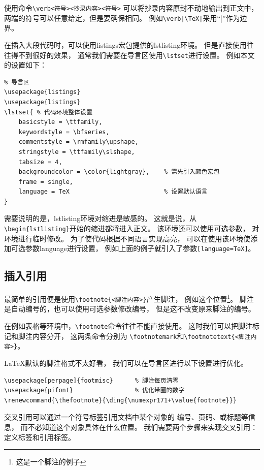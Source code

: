 \documentclass[UTF8]{ctexart}
\numberwithin{equation}{section}			%
\renewcommand{\thefootnote}{\ding{\numexpr171+\value{footnote}}}
\begin{document}
    使用命令\verb|\verb<符号><抄录内容><符号>|
    可以将抄录内容原封不动地输出到正文中，
    两端的符号可以任意给定，但是要确保相同。
    例如\verb~\verb|\TeX|~采用“|”作为边界。
    
    在插入大段代码时，可以使用listings宏包提供的lstlisting环境。
    但是直接使用往往得不到很好的效果，
    通常我们需要在导言区使用\verb|\lstset|进行设置。
    例如本文的设置如下：

\begin{lstlisting}
% 导言区
\usepackage{listings}
\usepackage{listings}
\lstset{ % 代码环境整体设置
    basicstyle = \ttfamily,
    keywordstyle = \bfseries,
    commentstyle = \rmfamily\upshape,
    stringstyle = \ttfamily\slshape,
    tabsize = 4,
    backgroundcolor = \color{lightgray},	% 需先引入颜色宏包
    frame = single,
    language = TeX							% 设置默认语言
}
\end{lstlisting}
    
    需要说明的是，lstlisting环境对缩进是敏感的。
    这就是说，从\verb|\begin{lstlisting}|开始的缩进都将进入正文。
    该环境还可以使用可选参数，
    对环境进行临时修改。
    为了使代码根据不同语言实现高亮，
    可以在使用该环境使添加可选参数language进行设置，
    例如上面的例子就引入了参数\verb|[language=TeX]|。
    
    \subsection{插入引用}
    最简单的引用便是使用\verb|\footnote{<脚注内容>}|产生脚注，
    例如这个位置\footnote{这是一个脚注的例子}。
    脚注是自动编号的，也可以使用可选参数修改编号，
    但是这不改变原来脚注的编号。
    
    在例如表格等环境中，\verb|\footnote|命令往往不能直接使用。
    这时我们可以把脚注标记和脚注内容分开\footnotemark，
    这两条命令分别为
    \verb|\footnotemark|和\verb|\footnotetext{<脚注内容>}|。
    
    \LaTeX 默认的脚注格式不太好看，
    我们可以在导言区进行以下设置进行优化。
    
\begin{lstlisting}
\usepackage[perpage]{footmisc}		% 脚注每页清零
\usepackage{pifont}					% 优化带圈的数字
\renewcommand{\thefootnote}{\ding{\numexpr171+\value{footnote}}}
\end{lstlisting}
    
    交叉引用可以通过一个符号标签引用文档中某个对象的
    编号、页码、或标题等信息，
    而不必知道这个对象具体在什么位置。
    我们需要两个步骤来实现交叉引用：
    定义标签和引用标签。
    
\end{document}
